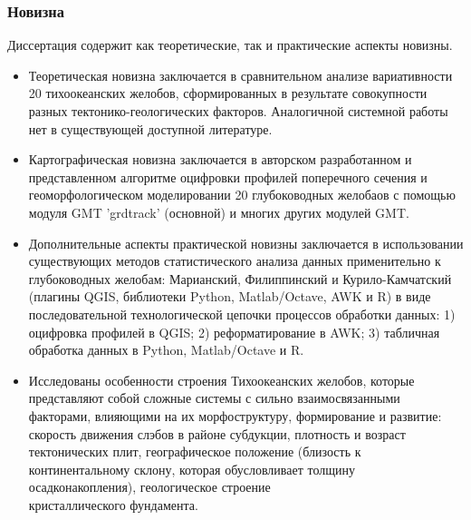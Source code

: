 \documentclass[pdflatex,compress,8pt,
	xcolor={dvipsnames,dvipsnames,svgnames,x11names,table},
	hyperref={colorlinks = true,breaklinks = true, urlcolor = NavyBlue}]{beamer}
\begin{document}
\begin{frame}\frametitle{Новизна}
Диссертация содержит как теоретические, так и практические аспекты новизны.

\begin{itemize}
            \item Теоретическая новизна заключается в сравнительном анализе вариативности 20 тихоокеанских желобов, сформированных в результате совокупности разных тектонико-геологических факторов. Аналогичной системной работы нет в существующей доступной литературе.
            \item Картографическая новизна заключается в авторском разработанном и представленном алгоритме оцифровки профилей поперечного сечения и геоморфологическом моделировании 20 глубоководных желобаов с помощью модуля GMT 'grdtrack' (основной) и многих других модулей GMT.
            \item Дополнительные аспекты практической новизны заключается в использовании существующих методов статистического анализа данных применительно к глубоководных желобам: Марианский, Филиппинский и Курило-Камчатский (плагины QGIS, библиотеки Python, Matlab/Octave, AWK и R) в виде последовательной технологической цепочки процессов обработки данных: 1) оцифровка профилей в  QGIS; 2) реформатирование в AWK; 3) табличная обработка данных в Python, Matlab/Octave и R. 
            \item Исследованы особенности строения Тихоокеанских желобов, которые представляют собой сложные системы с сильно взаимосвязанными факторами, влияющими на их морфоструктуру, формирование и развитие: скорость движения слэбов в районе субдукции, плотность и возраст тектонических плит, географическое положение (близость к континентальному склону, которая обусловливает толщину осадконакопления), геологическое строение \\кристаллического фундамента.
  
\end{itemize}

\end{frame}
\end{document}
